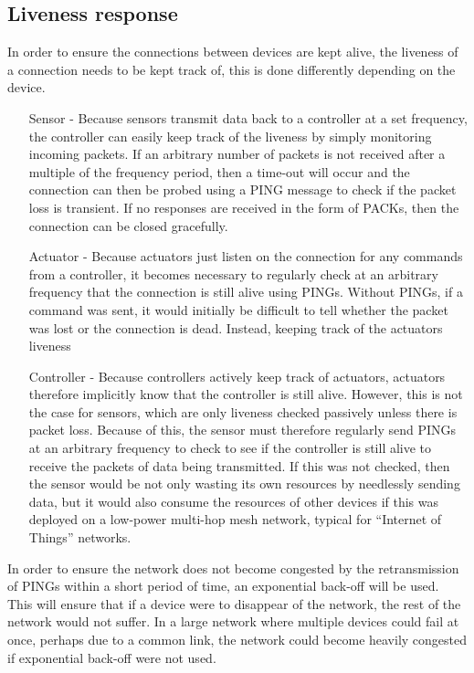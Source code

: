 \subsection{Liveness response} %
\label{sub:liveness_response}
In order to ensure the connections between devices are kept alive, the liveness of a connection needs to be kept track of, this is done differently depending on the device.
\begin{itemize}
	\item [Sensor -] Because sensors transmit data back to a controller at a set frequency, the controller can easily keep track of the liveness by simply monitoring incoming packets. If an arbitrary number of packets is not received after a multiple of the frequency period, then a time-out will occur and the connection can then be probed using a PING message to check if the packet loss is transient. If no responses are received in the form of PACKs, then the connection can be closed gracefully. 
	\item [Actuator -] Because actuators just listen on the connection for any commands from a controller, it becomes necessary to regularly check at an arbitrary frequency that the connection is still alive using PINGs. Without PINGs, if a command was sent, it would initially be difficult to tell whether the packet was lost or the connection is dead. Instead, keeping track of the actuators liveness 
	\item [Controller -] Because controllers actively keep track of actuators, actuators therefore implicitly know that the controller is still alive. However, this is not the case for sensors, which are only liveness checked passively unless there is packet loss. Because of this, the sensor must therefore regularly send PINGs at an arbitrary frequency to check to see if the controller is still alive to receive the packets of data being transmitted. If this was not checked, then the sensor would be not only wasting its own resources by needlessly sending data, but it would also consume the resources of other devices if this was deployed on a low-power multi-hop mesh network, typical for ``Internet of Things'' networks.
\end{itemize}

In order to ensure the network does not become congested by the retransmission of PINGs within a short period of time, an exponential back-off will be used. This will ensure that if a device were to disappear of the network, the rest of the network would not suffer. In a large network where multiple devices could fail at once, perhaps due to a common link, the network could become heavily congested if exponential back-off were not used.

